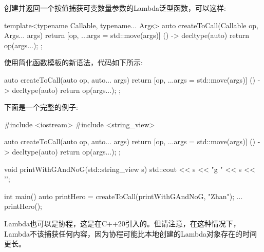 
创建并返回一个按值捕获可变数量参数的Lambda泛型函数，可以这样:

\begin{cpp}
template<typename Callable, typename... Args>
auto createToCall(Callable op, Args... args)
{
	return [op, ...args = std::move(args)] () -> decltype(auto) {
				return op(args...);
			};
}
\end{cpp}

使用简化函数模板的新语法，代码如下所示:

\begin{cpp}
auto createToCall(auto op, auto... args)
{
	return [op, ...args = std::move(args)] () -> decltype(auto) {
				return op(args...);
			};
}
\end{cpp}

下面是一个完整的例子:


\begin{cpp}
#include <iostream>
#include <string_view>

auto createToCall(auto op, auto... args)
{
	return [op, ...args = std::move(args)] () -> decltype(auto) {
		return op(args...);
	};
}

void printWithGAndNoG(std::string_view s)
{
	std::cout << s << "g " << s << '\n';
}

int main()
{
	auto printHero = createToCall(printWithGAndNoG, "Zhan");
	...
	printHero();
}
\end{cpp}



Lambda也可以是协程，这是在C++20引入的。但请注意，在这种情况下，Lambda不该捕获任何内容，因为协程可能比本地创建的Lambda对象存在的时间更长。













